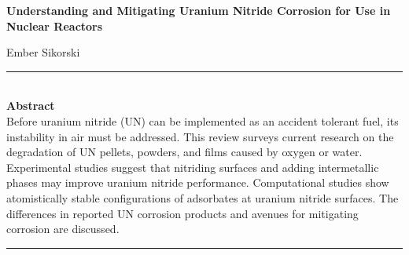 \documentclass[11pt]{article}
\newcommand{\vs}{\vspace{2mm}}
\begin{document}
\begin{center}
\textbf{Understanding and Mitigating Uranium Nitride Corrosion for Use in Nuclear Reactors} \par \vs
Ember Sikorski  \
\end{center}
\rule{6.5in}{0.1mm} \\
\vs
\textbf{Abstract} \\
Before uranium nitride (UN) can be implemented as an accident tolerant fuel, its instability in air must be addressed. This review surveys current research on the degradation of UN pellets, powders, and films caused by oxygen or water. Experimental studies suggest that nitriding surfaces and adding intermetallic phases may improve uranium nitride performance. Computational studies show atomistically stable configurations of adsorbates at uranium nitride surfaces. The differences in reported UN corrosion products and avenues for mitigating corrosion are discussed.
\\
\rule{6.5in}{0.1mm}	
\vs
\end{document}
